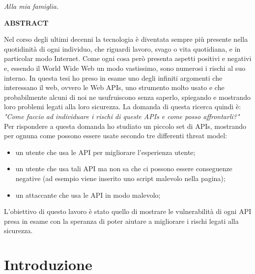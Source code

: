 \documentclass[11pt ,a4paper , twoside , openright ]{book}
\begin{document}
	\cleardoublepage
	\thispagestyle{empty}
	\begin{flushright}
		\vspace*{3.0cm}\textit{Alla mia famiglia.}
	\end{flushright}
	\cleardoublepage
	\begin{center}
		\textbf{ABSTRACT}
	\end{center}
	\begin{flushleft}
		Nel corso degli ultimi decenni la tecnologia è diventata sempre più presente nella quotidinità di ogni individuo, che riguardi lavoro, svago o vita quotidiana, e in particolar modo Internet.
		Come ogni cosa però presenta aspetti positivi e negativi e, essendo il World Wide Web un modo vastissimo, sono numerosi i rischi al suo interno.
		In questa tesi ho preso in esame uno degli infiniti argomenti che interessano il web, ovvero le Web APIs, uno strumento molto usato e che probabilmente alcuni di noi ne usufruiscono senza saperlo, spiegando e mostrando loro problemi legati alla loro sicurezza. La domanda di questa ricerca quindi è: \textit{"Come faccio ad individuare i rischi di queste APIs e come posso affrontarli?"}
		Per rispondere a questa domanda ho studiato un piccolo set di APIs, mostrando per ognuna come possono essere usate secondo tre differenti threat model: 
		\begin{itemize}
			\item un utente che usa le API per migliorare l'esperienza utente;
			\item un utente che usa tali API ma non sa che ci possono essere conseguenze negative (ad esempio viene inserito uno script malevolo nella pagina);
			\item un attaccante che usa le API in modo malevolo;
		\end{itemize}
		L'obiettivo di questo lavoro è stato quello di mostrare le vulnerabilità di ogni API presa in esame con la speranza di poter aiutare a migliorare i rischi legati alla sicurezza.	
	\end{flushleft}
	\cleardoublepage
	\dominitoc
	\tableofcontents
	
	\cleardoublepage
	\chapter{Introduzione}
	
\end{document}
